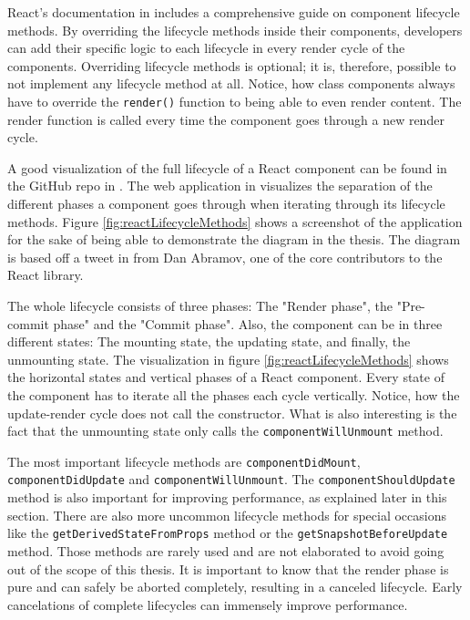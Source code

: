 React's documentation in \cite[/docs/react-component.html]{React} includes a comprehensive guide on component lifecycle methods. By overriding the lifecycle methods inside their components, developers can add their specific logic to each lifecycle in every render cycle of the components. Overriding lifecycle methods is optional; it is, therefore, possible to not implement any lifecycle method at all. Notice, how class components always have to override the \texttt{render()} function to being able to even render content. The render function is called every time the component goes through a new render cycle.

A good visualization of the full lifecycle of a React component can be found in the GitHub repo in \cite{ReactRenderCycleGithub}. The web application in \cite{ReactRenderCycleDiagram} visualizes the separation of the different phases a component goes through when iterating through its lifecycle methods. Figure \ref{fig:reactLifecycleMethods} shows a screenshot of the application for the sake of being able to demonstrate the diagram in the thesis. The diagram is based off a tweet in \cite{ReactCycleTweet} from Dan Abramov, one of the core contributors to the React library.

The whole lifecycle consists of three phases: The "Render phase", the "Pre-commit phase" and the "Commit phase". Also, the component can be in three different states: The mounting state, the updating state, and finally, the unmounting state. The visualization in figure \ref{fig:reactLifecycleMethods} shows the horizontal states and vertical phases of a React component. Every state of the component has to iterate all the phases each cycle vertically. Notice, how the update-render cycle does not call the constructor. What is also interesting is the fact that the unmounting state only calls the \texttt{componentWillUnmount} method.

The most important lifecycle methods are \texttt{component\-Did\-Mount}, \texttt{component\-Did\-Update} and \texttt{component\-Will\-Unmount}. The \texttt{componentShouldUpdate} method is also important for improving performance, as explained later in this section. There are also more uncommon lifecycle methods for special occasions like the \texttt{getDerivedStateFromProps} method or the \texttt{getSnapshotBeforeUpdate} method. Those methods are rarely used and are not elaborated to avoid going out of the scope of this thesis. It is important to know that the render phase is pure and can safely be aborted completely, resulting in a canceled lifecycle. Early cancelations of complete lifecycles can immensely improve performance.

